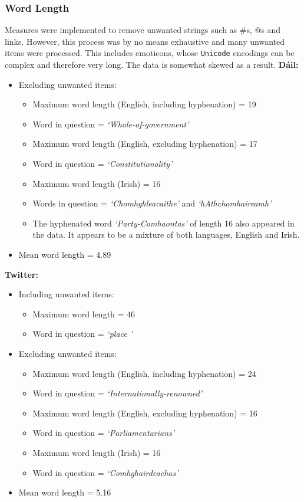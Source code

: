 \documentclass[a4paper,11pt]{article}
\begin{document}
\subsubsection{Word Length}
Measures were implemented to remove unwanted strings such as \#s, @s and links. However, this process was by no means exhaustive and many unwanted items were processed. This includes emoticons, whose \texttt{Unicode} encodings can be complex and therefore very long. The data is somewhat skewed as a result. \newline
\textbf{Dáil:}
\begin{itemize}
    \item Excluding unwanted items:
    \begin{itemize}
        \item Maximum word length (English, including hyphenation) = 19
        \item Word in question = \textit{`Whole-of-government'}
        \item Maximum word length (English, excluding hyphenation) = 17
        \item Word in question = \textit{`Constitutionality'}
        \item Maximum word length (Irish) = 16
        \item Words in question = \textit{`Chomhghleacaithe'} and \textit{`hAthchomhaireamh'}
        \item The hyphenated word \textit{`Party-Comhaontas'} of length 16 also appeared in the data. It appears to be a mixture of both languages, English and Irish.
    \end{itemize}
    \item Mean word length = 4.89
\end{itemize}
\textbf{Twitter:}
\begin{itemize}
    \item Including unwanted items:
    \begin{itemize}
        \item Maximum word length = 46
        \item Word in question = \textit{`place '}
    \end{itemize}
    \item Excluding unwanted items:
    \begin{itemize}
        \item Maximum word length (English, including hyphenation) = 24
        \item Word in question = \textit{`Internationally-renowned'}
        \item Maximum word length (English, excluding hyphenation) = 16
        \item Word in question = \textit{`Parliamentarians'}
        \item Maximum word length (Irish) = 16
        \item Word in question = \textit{`Comhghairdeachas'}
    \end{itemize}
    \item Mean word length = 5.16
\end{itemize}
\end{document}

